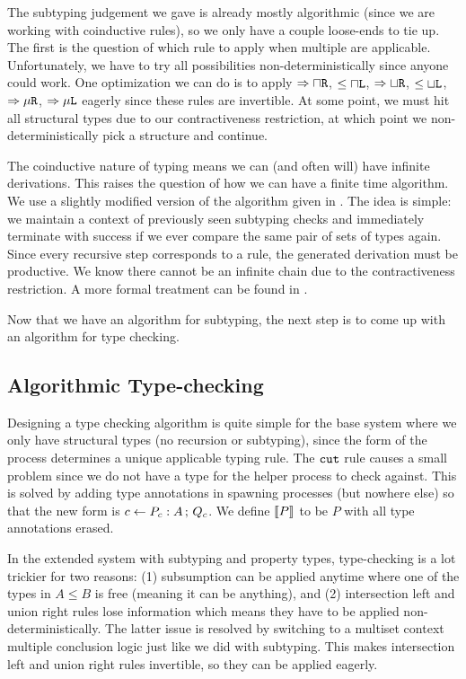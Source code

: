 \documentclass[a4paper,USenglish]{lipics-v2016}
\begin{document}
The subtyping judgement we gave is already mostly algorithmic (since we are working with coinductive rules), so we only have a couple loose-ends to tie up. The first is the question of which rule to apply when multiple are applicable. Unfortunately, we have to try all possibilities non-deterministically since anyone could work. One optimization we can do is to apply $\Rightarrow{\mathbin{\sqcap}\texttt{R}}$, $\le{\mathbin{\sqcap}\texttt{L}}$, $\Rightarrow{\mathbin{\sqcup}\texttt{R}}$, $\le{\mathbin{\sqcup}\texttt{L}}$, $\Rightarrow{\mu\texttt{R}}$, $\Rightarrow{\mu\texttt{L}}$ eagerly since these rules are invertible. At some point, we must hit all structural types due to our contractiveness restriction, at which point we non-deterministically pick a structure and continue. 

The coinductive nature of typing means we can (and often will) have infinite derivations. This raises the question of how we can have a finite time algorithm. We use a slightly modified version of the algorithm given in \cite{GayH05}. The idea is simple: we maintain a context of previously seen subtyping checks and immediately terminate with success if we ever compare the same pair of sets of types again. Since every recursive step corresponds to a rule, the generated derivation must be productive. We know there cannot be an infinite chain due to the contractiveness restriction. A more formal treatment can be found in \cite{StoneS2005}.

Now that we have an algorithm for subtyping, the next step is to come up with an algorithm for type checking.


\subsection{Algorithmic Type-checking}

Designing a type checking algorithm is quite simple for the base system where we only have structural types (no recursion or subtyping), since the form of the process determines a unique applicable typing rule. The $\texttt{cut}$ rule causes a small problem since we do not have a type for the helper process to check against. This is solved by adding type annotations in spawning processes (but nowhere else) so that the new form is $c \leftarrow P_c : A \,;\, Q_c$. We define $\left \llbracket {P} \right \rrbracket$ to be $P$ with all type annotations erased.

In the extended system with subtyping and property types, type-checking is a lot trickier for two reasons: (1) subsumption can be applied anytime where one of the types in $A \le B$ is free (meaning it can be anything), and (2) intersection left and union right rules lose information which means they have to be applied non-deterministically. The latter issue is resolved by switching to a multiset context multiple conclusion logic just like we did with subtyping. This makes intersection left and union right rules invertible, so they can be applied eagerly.
\end{document}
